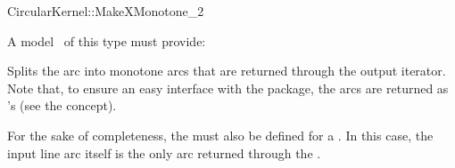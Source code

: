 \begin{ccRefFunctionObjectConcept}{CircularKernel::MakeXMonotone_2}


A model \ccVar\ of this type must provide:

{Splits the arc  into monotone arcs that are returned through the 
output iterator. Note that, to ensure an easy interface with the 
 package, the arcs are returned as 's 
(see the  concept).}

For the sake of completeness, the  must also be
defined for a
. In this case, the input line arc itself is the only
arc returned through the . 



\end{ccRefFunctionObjectConcept}
